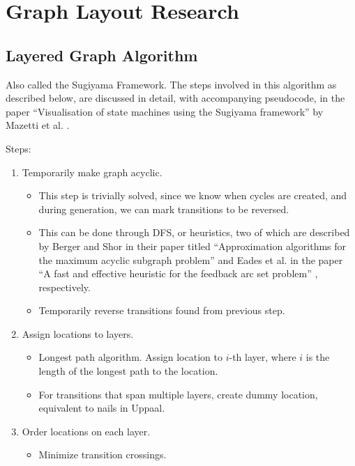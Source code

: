 \section{Graph Layout Research}


\subsection{Layered Graph Algorithm}
Also called the Sugiyama Framework. The steps involved in this algorithm as described below, are discussed in detail, with accompanying pseudocode, in the paper ``Visualisation of state machines using the Sugiyama framework'' by Mazetti et al. \cite{Mazetti2012}.
\noindent

Steps:
\begin{enumerate}
    \item Temporarily make graph acyclic.
          \begin{itemize}
              \item This step is trivially solved, since we know when cycles are created, and during generation, we can mark transitions to be reversed.
              \item This can be done through DFS, or heuristics, two of which are described by Berger and Shor in their paper titled ``Approximation algorithms for the maximum acyclic subgraph problem'' \cite{Berger1990} and Eades et al. in the paper ``A fast and effective heuristic for the feedback arc set problem'' \cite{Eades1993}, respectively.
              \item Temporarily reverse transitions found from previous step.
          \end{itemize}
    \item Assign locations to layers.
          \begin{itemize}
              \item Longest path algorithm. Assign location to $i$-th layer, where $i$ is the length of the longest path to the location.
              \item For transitions that span multiple layers, create dummy location, equivalent to nails in Uppaal.
          \end{itemize}
    \item Order locations on each layer.
          \begin{itemize}
              \item Minimize transition crossings.

\end{itemize}
\end{enumerate}
